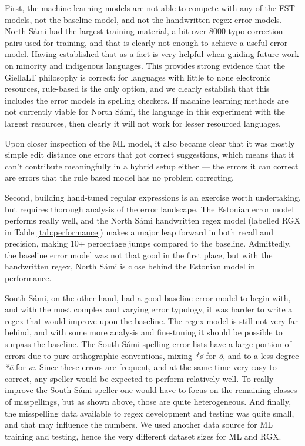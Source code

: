 \documentclass{flammie}
\begin{document}
First, the machine learning models are not able to compete with any of the FST
models, not the baseline model, and not the handwritten regex error models.
North Sámi had the largest training material, a bit over 8000 typo-correction
pairs used for training, and that is clearly not enough to achieve a useful
error model. Having established that as a fact is very helpful when guiding
future work on minority and indigenous languages. This provides strong evidence
that the GiellaLT philosophy is correct: for languages with little to none
electronic resources, rule-based is the only option, and we clearly establish
that this includes the error models in spelling checkers. If machine learning
methods are not currently viable for North Sámi, the language in this experiment
with the largest resources, then clearly it will not work for lesser resourced
languages.

Upon closer inspection of the ML model, it also became clear that it was mostly
simple edit distance one errors that got correct suggestions, which means that
it can't contribute meaningfully in a hybrid setup either --- the errors it can
correct are errors that the rule based model has no problem correcting.

Second, building hand-tuned regular expressions is an exercise worth
undertaking, but requires thorough analysis of the error landscape. The Estonian
error model performs really well, and the North Sámi handwritten regex model
(labelled RGX in Table \ref{tab:performance}) makes a major leap forward in both
recall and precision, making 10+ percentage jumps compared to the baseline.
Admittedly, the baseline error model was not that good in the first place, but
with the handwritten regex, North Sámi is close behind the Estonian model in
performance.

South Sámi, on the other hand, had a good baseline error model to begin with,
and with the most complex and varying error typology, it was harder to write a
regex that would improve upon the baseline. The regex model is still not very
far behind, and with some more analysis and fine-tuning it should be possible to
surpass the baseline.  The South Sámi spelling error lists have a large portion
of errors due to pure orthographic conventions, mixing \textit{*ø} for
\textit{ö}, and to a less degree \textit{*ä} for \textit{æ}. Since these errors
are frequent, and at the same time very easy to correct, any speller would be
expected to perform relatively well. To really improve the South Sámi speller
one would have to focus on the remaining classes of misspellings, but as shown
above, those are quite heterogeneous. And finally, the misspelling data
available to regex development and testing was quite small, and that may
influence the numbers. We used another data source for ML training and testing,
hence the very different dataset sizes for ML and RGX.
\end{document}

